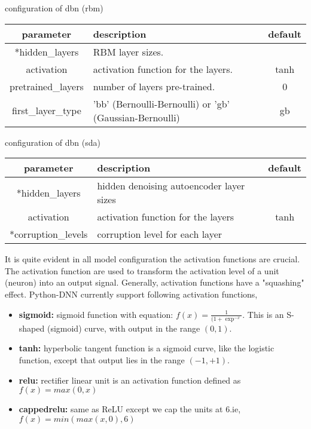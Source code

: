 \begin{table}[!htbp] 
 \begin{center}
  	\medskip  \small configuration of dbn (rbm)
	\begin{tabular}{|c|p{8cm}|c|} \hline
   	\textbf{parameter} & \textbf{description} & \textbf{default}\\  \hline
	*hidden\_layers &  RBM layer sizes. & \\ \hline
	activation & activation function for the layers. & tanh \\ \hline
	pretrained\_layers & number of layers  pre-trained. & 0 \\ \hline
	first\_layer\_type & 'bb' (Bernoulli-Bernoulli) or 'gb' (Gaussian-Bernoulli) & gb  \\ 	\hline 
	\end{tabular}		
\end{center}
\end{table} 
\begin{table}[!htbp] 
 \begin{center}
  	\medskip  \small configuration of dbn (sda)
	\begin{tabular}{|c|p{8cm}|c|} \hline
   	\textbf{parameter} & \textbf{description} & \textbf{default}\\  \hline
	*hidden\_layers &  hidden denoising autoencoder layer sizes & \\ \hline
	activation & activation function for the layers & tanh \\ \hline
	*corruption\_levels & corruption level for each layer &  \\ \hline
	\end{tabular}		
\end{center} 
\end{table} 
\noindent It is quite evident in all model configuration the activation functions are crucial. The activation function are used to transform the activation level of a unit (neuron) into an output signal. Generally, activation functions have a "squashing" effect. Python-DNN currently support following activation functions,
\begin{itemize}
\item {\textbf{sigmoid:} sigmoid function with equation: $f(x) = \frac{1}{(1 + \exp^{-x}}$. This is an S-shaped (sigmoid) curve, with output in the range $(0,1)$.}
\item {\textbf{tanh:} hyperbolic tangent function is a sigmoid curve, like the logistic function, except that output lies in the range $(-1,+1)$.} 
\item {\textbf{relu:} rectifier linear unit is an activation function defined as $f(x) = max(0, x)$}
\item {\textbf{cappedrelu:} same as ReLU except we cap the units at 6.ie, $f(x) = min(max(x,0),6)$}
\end{itemize}
\clearpage


